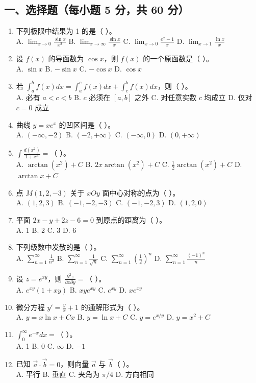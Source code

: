 \documentclass[11pt,a4paper]{article}
\begin{document}
\subsection*{一、选择题（每小题 5 分，共 60 分）}
\begin{enumerate}
    \item 下列极限中结果为 1 的是（ ）。 \\
    A. $\lim_{x \to 0} \frac{\sin x}{x^2}$ \quad B. $\lim_{x \to \infty} \frac{\sin x}{x}$ \quad C. $\lim_{x \to 0} \frac{e^x-1}{x}$ \quad D. $\lim_{x \to 1} \frac{\ln x}{x}$
    \item 设 $f(x)$ 的导函数为 $\cos x$，则 $f(x)$ 的一个原函数是（ ）。 \\
    A. $\sin x$ \quad B. $-\sin x$ \quad C. $-\cos x$ \quad D. $\cos x$
    \item 若 $\int_a^b f(x) dx = \int_a^c f(x) dx + \int_c^b f(x) dx$，则（ ）。 \\
    A. 必有 $a < c < b$ \quad B. $c$ 必须在 $[a,b]$ 之外 \quad C. 对任意实数 $c$ 均成立 \quad D. 仅对 $c=0$ 成立
    \item 曲线 $y = x e^x$ 的凹区间是（ ）。 \\
    A. $(-\infty, -2)$ \quad B. $(-2, +\infty)$ \quad C. $(-\infty, 0)$ \quad D. $(0, +\infty)$
    \item $\int \frac{d(x^2)}{1+x^4} = $（ ）。 \\
    A. $\arctan(x^2) + C$ \quad B. $2x \arctan(x^2) + C$ \quad C. $\frac{1}{2} \arctan(x^2) + C$ \quad D. $\arctan x + C$
    \item 点 $M(1, 2, -3)$ 关于 $xOy$ 面中心对称的点为（ ）。 \\
    A. $(1, 2, 3)$ \quad B. $(-1, -2, -3)$ \quad C. $(-1, -2, 3)$ \quad D. $(1, 2, 0)$
    \item 平面 $2x - y + 2z - 6 = 0$ 到原点的距离为（ ）。 \\
    A. 1 \quad B. 2 \quad C. 3 \quad D. 6
    \item 下列级数中发散的是（ ）。 \\
    A. $\sum_{n=1}^{\infty} \frac{1}{n^2}$ \quad B. $\sum_{n=1}^{\infty} \frac{1}{\sqrt{n}}$ \quad C. $\sum_{n=1}^{\infty} (\frac{1}{2})^n$ \quad D. $\sum_{n=1}^{\infty} \frac{(-1)^n}{n}$
    \item 设 $z = e^{xy}$，则 $\frac{\partial^2 z}{\partial x \partial y} = $（ ）。 \\
    A. $e^{xy}(1+xy)$ \quad B. $xy e^{xy}$ \quad C. $e^{xy}$ \quad D. $x e^{xy}$
    \item 微分方程 $y' = \frac{y}{x} + 1$ 的通解形式为（ ）。 \\
    A. $y = x \ln x + Cx$ \quad B. $y = \ln x + C$ \quad C. $y = e^{x/y}$ \quad D. $y = x^2 + C$
    \item $\int_0^{\infty} e^{-x} dx = $（ ）。 \\
    A. 1 \quad B. 0 \quad C. $\infty$ \quad D. $-1$
    \item 已知 $\vec{a} \cdot \vec{b} = 0$，则向量 $\vec{a}$ 与 $\vec{b}$（ ）。 \\
    A. 平行 \quad B. 垂直 \quad C. 夹角为 $\pi/4$ \quad D. 方向相同
\end{enumerate}
\end{document}
